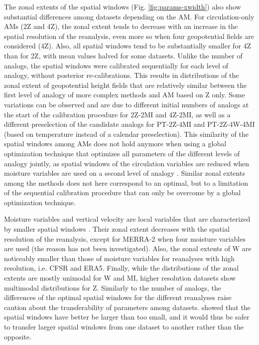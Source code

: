 \documentclass[alpha-refs]{wiley-article}
\begin{document}
The zonal extents of the spatial windows (Fig. \ref{fig:params-xwidth}) also show substantial differences among datasets depending on the AM. For circulation-only AMs (2Z and 4Z), the zonal extent tends to decrease with an increase in the spatial resolution of the reanalysis, even more so when four geopotential fields are considered (4Z). Also, all spatial windows tend to be substantially smaller for 4Z than for 2Z, with mean values halved for some datasets. Unlike the number of analogs, the spatial windows were calibrated sequentially for each level of analogy, without posterior re-calibrations. This results in distributions of the zonal extent of geopotential height fields that are relatively similar between the first level of analogy of more complex methods and AM based on Z only. Some variations can be observed and are due to different initial numbers of analogs at the start of the calibration procedure for 2Z-2MI and 4Z-2MI, as well as a different preselection of the candidate analogs for PT-2Z-4MI and PT-2Z-4W-4MI (based on temperature instead of a calendar preselection). This similarity of the spatial windows among AMs does not hold anymore when using a global optimization technique that optimizes all parameters of the different levels of analogy jointly, as spatial windows of the circulation variables are reduced when moisture variables are used on a second level of analogy  \citep{Horton2018a}. Similar zonal extents among the methods does not here correspond to an optimal, but to a limitation of the sequential calibration procedure that can only be overcome by a global optimization technique.

Moisture variables and vertical velocity are local variables that are characterized by smaller spatial windows \citep{BenDaoud2016, Horton2018a}. Their zonal extent decreases with the spatial resolution of the reanalysis, except for MERRA-2 when four moisture variables are used (the reason has not been investigated). Also, the zonal extents of W are noticeably smaller than those of moisture variables for reanalyses with high resolution, i.e. CFSR and ERA5. Finally, while the distributions of the zonal extents are mostly unimodal for W and MI, higher resolution datasets show multimodal distributions for Z. Similarly to the number of analogs, the differences of the optimal spatial windows for the different reanalyses raise caution about the transferability of parameters among datasets. \citet{Horton2019} showed that the spatial windows have better be larger than too small, and it would thus be safer to transfer larger spatial windows from one dataset to another rather than the opposite. 
\end{document}
